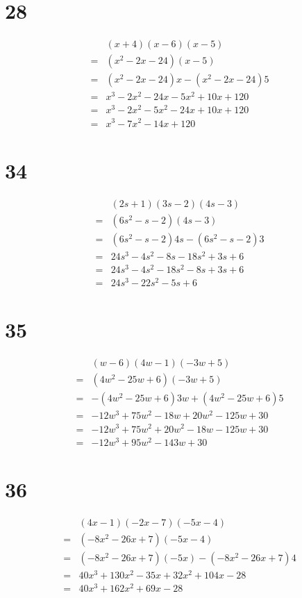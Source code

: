 \documentclass{article}
\theoremstyle{definition}
\begin{document}
\section*{28}
\[
\begin{array}{rl}
	& (x+4)(x-6)(x-5) \\
=	& (x^2-2x-24)(x-5) \\
=	& (x^2-2x-24)x-(x^2-2x-24)5 \\
=	& x^3-2x^2-24x-5x^2+10x+120 \\
=	& x^3-2x^2-5x^2-24x+10x+120 \\
=	& x^3-7x^2-14x+120
\end{array}
\]

\section*{34}
\[
\begin{array}{rl}
	& (2s+1)(3s-2)(4s-3) \\
=	& (6s^2-s-2)(4s-3) \\
=	& (6s^2-s-2)4s-(6s^2-s-2)3 \\
=	& 24s^3-4s^2-8s-18s^2+3s+6 \\
=	& 24s^3-4s^2-18s^2-8s+3s+6 \\
=	& 24s^3-22s^2-5s+6
\end{array}
\]

\section*{35}
\[
\begin{array}{rl}
	& (w-6)(4w-1)(-3w+5) \\
=	& (4w^2-25w+6)(-3w+5) \\
=	& -(4w^2-25w+6)3w+(4w^2-25w+6)5 \\
=	& -12w^3+75w^2-18w+20w^2-125w+30 \\
=	& -12w^3+75w^2+20w^2-18w-125w+30 \\
=	& -12w^3+95w^2-143w+30
\end{array}
\]

\section*{36}
\[
\begin{array}{rl}
	& (4x-1)(-2x-7)(-5x-4) \\
=	& (-8x^2-26x+7)(-5x-4) \\
=	& (-8x^2-26x+7)(-5x)-(-8x^2-26x+7)4 \\
=	& 40x^3+130x^2-35x+32x^2+104x-28 \\
=	& 40x^3+162x^2+69x-28
\end{array}
\]
\end{document}

